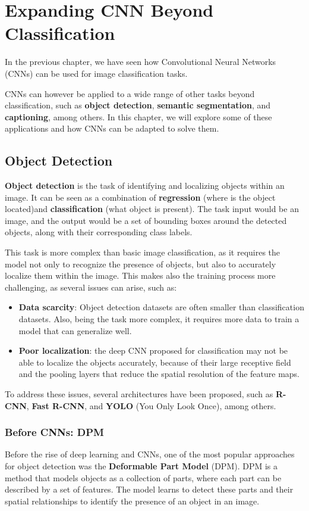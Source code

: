 \section{Expanding CNN Beyond Classification}
In the previous chapter, we have seen how Convolutional Neural Networks (CNNs) can be used for image classification tasks. 

CNNs can however be applied to a wide range of other tasks beyond classification, such as \textbf{object detection}, 
\textbf{semantic segmentation}, and \textbf{captioning}, among others.
In this chapter, we will explore some of these applications and how CNNs can be adapted to solve them.

\subsection{Object Detection}
\textbf{Object detection} is the task of identifying and localizing objects within an image. It can be seen as a combination of
\textbf{regression} (where is the object located)and \textbf{classification} (what object is present).
The task input would be an image, and the output would be a set of bounding boxes around the detected objects, along with their corresponding class labels.

This task is more complex than basic image classification, as it requires the model not only to recognize the presence of objects, 
but also to accurately localize them within the image.
This makes also the training process more challenging, as several issues can arise, such as:
\begin{itemize}
    \item \textbf{Data scarcity}: Object detection datasets are often smaller than classification datasets. Also,
    being the task more complex, it requires more data to train a model that can generalize well.
    \item \textbf{Poor localization}: the deep CNN proposed for classification may not be able to localize the objects accurately, 
    because of their large receptive field and the pooling layers that reduce the spatial resolution of the feature maps.
\end{itemize}

To address these issues, several architectures have been proposed, such as \textbf{R-CNN}, \textbf{Fast R-CNN}, and \textbf{YOLO} (You Only Look Once), among others.

\subsubsection{Before CNNs: DPM}
Before the rise of deep learning and CNNs, one of the most popular approaches for object detection was the \textbf{Deformable Part Model} (DPM).
DPM is a method that models objects as a collection of parts, where each part can be described by a set of features. 
The model learns to detect these parts and their spatial relationships to identify the presence of an object in an image.

